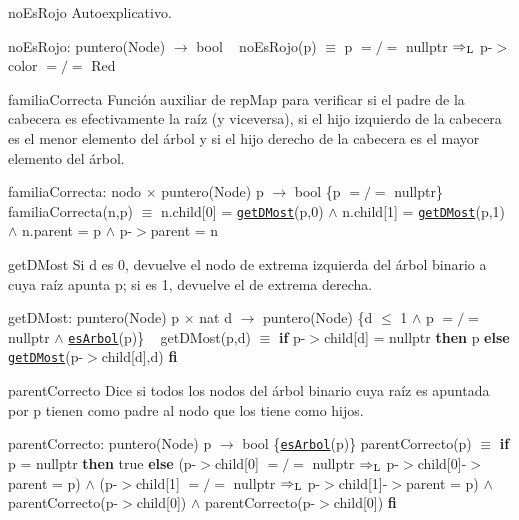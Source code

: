 \begin{DoxyParagraph}{no\+Es\+Rojo}
Autoexplicativo.

no\+Es\+Rojo\+: puntero(\+Node) $\to$ bool ~\newline
no\+Es\+Rojo(p) $\equiv$ p $=/=$ nullptr $\Rightarrow_{\rm L}$ p-\/$>$color $=/=$ Red


\end{DoxyParagraph}
\begin{DoxyParagraph}{familia\+Correcta}
Función auxiliar de rep\+Map para verificar si el padre de la cabecera es efectivamente la raíz (y viceversa), si el hijo izquierdo de la cabecera es el menor elemento del árbol y si el hijo derecho de la cabecera es el mayor elemento del árbol.

familia\+Correcta\+: nodo $\times$ puntero(\+Node) p $\to$ bool \{p $=/=$ nullptr\} ~\newline
familia\+Correcta(n,p) $\equiv$ n.\+child\mbox{[}0\mbox{]} = \href{axiomas.html#getDMost}{\tt get\+D\+Most}(p,0) $\land$ n.\+child\mbox{[}1\mbox{]} = \href{axiomas.html#getDMost}{\tt get\+D\+Most}(p,1) $\land$ n.\+parent = p $\land$ p-\/$>$parent = n


\end{DoxyParagraph}
\begin{DoxyParagraph}{get\+D\+Most}
Si d es 0, devuelve el nodo de extrema izquierda del árbol binario a cuya raíz apunta p; si es 1, devuelve el de extrema derecha.

get\+D\+Most\+: puntero(\+Node) p $\times$ nat d $\to$ puntero(\+Node) \{d $\leq$ 1 $\land$ p $=/=$ nullptr $\land$ \href{axiomas.html#esArbol}{\tt es\+Arbol}(p)\} ~\newline
get\+D\+Most(p,d) $\equiv$ {\bfseries if} p-\/$>$child\mbox{[}d\mbox{]} = nullptr {\bfseries then} p {\bfseries else} \href{axiomas.html#getDMost}{\tt get\+D\+Most}(p-\/$>$child\mbox{[}d\mbox{]},d) {\bfseries fi} 


\end{DoxyParagraph}
\begin{DoxyParagraph}{parent\+Correcto}
Dice si todos los nodos del árbol binario cuya raíz es apuntada por p tienen como padre al nodo que los tiene como hijos.

parent\+Correcto\+: puntero(\+Node) p $\to$ bool \{\href{axiomas.html#esArbol}{\tt es\+Arbol}(p)\} parent\+Correcto(p) $\equiv$ {\bfseries if} p = nullptr {\bfseries then} true {\bfseries else} (p-\/$>$child\mbox{[}0\mbox{]} $=/=$ nullptr $\Rightarrow_{\rm L}$ p-\/$>$child\mbox{[}0\mbox{]}-\/$>$parent = p) $\land$ (p-\/$>$child\mbox{[}1\mbox{]} $=/=$ nullptr $\Rightarrow_{\rm L}$ p-\/$>$child\mbox{[}1\mbox{]}-\/$>$parent = p) $\land$ parent\+Correcto(p-\/$>$child\mbox{[}0\mbox{]}) $\land$ parent\+Correcto(p-\/$>$child\mbox{[}0\mbox{]}) {\bfseries fi} 


\end{DoxyParagraph}
